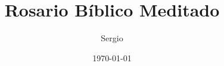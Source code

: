 \documentclass[11pt,a4paper]{report}
\title{Rosario Bíblico Meditado}
\author{Sergio}
\date{\today}
\begin{document}
\begin{titlepage}
    \maketitle
\end{titlepage}





\newpage



\newpage



\newpage



\newpage


\end{document}
